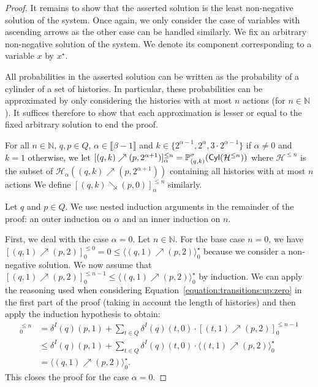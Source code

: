 \documentclass[a4paper,UKenglish,cleveref,autoref,thm-restate,colorlinks]{lipics-v2021}
\newcommand{\integerInterval}[1]{\llbracket{}#1\rrbracket{}}
\newcommand{\IN}{\mathbb{N}}
\newcommand{\cyl}[1]{\mathsf{Cyl}(#1)}
\newcommand{\histPart}{\mathcal{H}}
\newcommand{\indexLast}{n}
\newcommand{\ocStateSpace}{Q}
\newcommand{\ocState}{q}
\newcommand{\ocStateB}{p}
\newcommand{\ocStateC}{t}
\newcommand{\ocCount}{k}
\newcommand{\ocTrans}{\delta}
\newcommand{\interval}{I}
\newcommand{\powerIndex}{\alpha}
\newcommand{\powerMax}{\beta}
\newcommand{\upProba}[5]{[(#1,#2)\nearrow{}(#3,#4)]_{#5}}
\newcommand{\downProba}[5]{[(#1,#2)\searrow{}(#3,#4)]_{#5}}
\newcommand{\upProbaVar}[5]{\langle (#1,#2)\nearrow{}(#3,#4)\rangle_{#5}}
\newcommand{\upHistSet}[5]{\histPart_{#5}((#1,#2)\nearrow{}(#3,#4))}
\newcommand{\varTrans}{x}
\newcommand{\stratGeneric}[1]{{\sigma_{#1}}}
\newcommand{\strat}{\stratGeneric{}}
\begin{document}
\begin{proof}
  It remains to show that the asserted solution is the least non-negative solution of the system.
  Once again, we only consider the case of variables with ascending arrows as the other case can be handled similarly.
  We fix an arbitrary non-negative solution of the system.
  We denote its component corresponding to a variable $\varTrans$ by $\varTrans^\star$.

  All probabilities in the asserted solution can be written as the probability of a cylinder of a set of histories.
  In particular, these probabilities can be approximated by only considering the histories with at most $\indexLast$ actions (for $\indexLast\in\IN$).
  It suffices therefore to show that each approximation is lesser or equal to the fixed arbitrary solution to end the proof.
  
  For all $\indexLast\in\IN$, $\ocState, \ocStateB\in\ocStateSpace$, $\powerIndex\in\integerInterval{\powerMax-1}$ and $\ocCount\in\{2^{\powerIndex-1}, 2^{\powerIndex}, 3\cdot 2^{\powerIndex-1}\}$ if $\powerIndex\neq 0$ and $\ocCount = 1$ otherwise, we let $\upProba{\ocState}{\ocCount}{\ocStateB}{2^{\powerIndex+1}}{\powerIndex}^{\leq\indexLast} = \probaG{(\ocState, \ocCount)}{\strat}(\cyl{\histPart^{\leq\indexLast}})$ where $\histPart^{\leq\indexLast}$ is the subset of $\upHistSet{\ocState}{\ocCount}{\ocStateB}{2^{\powerIndex+1}}{\powerIndex}$ containing all histories with at most $\indexLast$ actions
  We define $\downProba{\ocState}{\ocCount}{\ocStateB}{0}{\powerIndex}^{\leq\indexLast}$ similarly.

  Let $\ocState$ and $\ocStateB\in\ocStateSpace$.
  We use nested induction arguments in the remainder of the proof: an outer induction on $\powerIndex$ and an inner induction on $\indexLast$.

  First, we deal with the case $\powerIndex = 0$.
  Let $\indexLast\in\IN$.
  For the base case $\indexLast=0$, we have $\upProba{\ocState}{1}{\ocStateB}{2}{0}^{\leq 0} = 0 \leq \upProbaVar{\ocState}{1}{\ocStateB}{2}{0}^\star$ because we consider a non-negative solution.
  We now assume that $\upProba{\ocState}{1}{\ocStateB}{2}{0}^{\leq \indexLast-1} \leq \upProbaVar{\ocState}{1}{\ocStateB}{2}{0}^\star$ by induction.
  We can apply the reasoning used when considering Equation~\eqref{equation:transitions:up:zero} in the first part of the proof (taking in account the length of histories) and then apply the induction hypothesis to obtain:
  \begin{align*}
    \upProba{\ocState}{1}{\ocStateB}{2}{0}^{\leq\indexLast}
    & =\ocTrans^\interval(\ocState)(\ocStateB, 1) +
    \sum_{\ocStateC\in\ocStateSpace} \ocTrans^\interval(\ocState)(\ocStateC, 0)\cdot
      \upProba{\ocStateC}{1}{\ocStateB}{2}{0}^{\leq\indexLast-1} \\
    & \leq \ocTrans^\interval(\ocState)(\ocStateB, 1) +
      \sum_{\ocStateC\in\ocStateSpace}
      \ocTrans^\interval(\ocState)(\ocStateC, 0)\cdot
      \upProbaVar{\ocStateC}{1}{\ocStateB}{2}{0}^\star \\
    & = \upProbaVar{\ocState}{1}{\ocStateB}{2}{0}^\star.
  \end{align*}
  This closes the proof for the case $\powerIndex=0$.


\end{proof}
\end{document}
